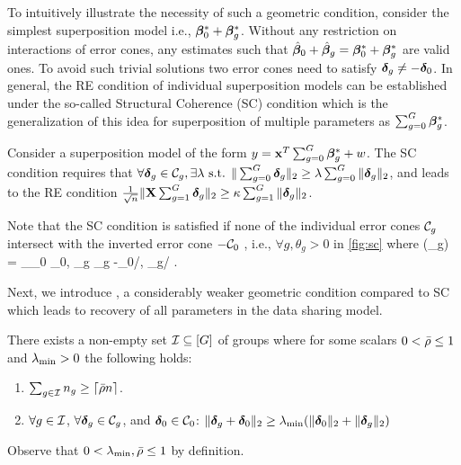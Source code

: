 To intuitively illustrate the necessity of such a geometric condition, consider the simplest superposition model i.e., $\boldsymbol{\beta}^*_0 + \boldsymbol{\beta}^*_g$. Without any restriction on interactions of error cones, any estimates such that $\hat{\boldsymbol{\beta}}_0 + \hat{\boldsymbol{\beta}}_g = \boldsymbol{\beta}^*_0 + \boldsymbol{\beta}^*_g$ are valid ones. To avoid such trivial solutions two error cones need to satisfy $\boldsymbol{\delta}_g \neq -\boldsymbol{\delta}_0$. In general, the RE condition of individual superposition models can be established under the so-called Structural Coherence (SC) condition \cite{guba16, mctr13} which is the generalization of this idea for superposition of multiple parameters as $\sum_{g = 0}^{G} \boldsymbol{\beta}^*_g$.
 
\begin{definition} \label{scc}
	Consider a superposition model of the form $y = \mathbf{x}^T \sum_{g = 0}^{G} \boldsymbol{\beta}^*_g + w$. The SC condition requires that
$	\forall \ddelta_g \in \cC_g, \exists \lambda \text{ s.t. }  \norm{\sum_{g = 0}^{G} \ddelta_g}{2} \geq  \lambda \sum_{g = 0}^{G}  \norm{\ddelta_g}{2}$,
	and leads to the RE condition $\frac{1}{\sqrt{n}}\|\mathbf{X} \sum_{g = 1}^{G} \boldsymbol{\delta}_g\|_{2} \geq \kappa \sum_{g=1}^{G} \|\boldsymbol{\delta}_g\|_{2}$.
\end{definition}

\begin{remark}
	Note that the SC condition is satisfied if none of the individual error cones $\cC_g$ intersect with the inverted error cone $-\cC_0$ \cite{guba16, trop15}, i.e., $\forall g, \theta_g > 0$ in \cref{fig:sc} where 
	\be 
	\nr 
	\cos(\theta_g) = \sup_{\ddelta_0 \in \cC_0, \ddelta_g \in \cC_g} -\langle \ddelta_0/, \ddelta_g/ \rangle.
	\ee
\end{remark}
Next, we introduce \ds, a considerably weaker geometric condition compared to SC which leads to recovery of all parameters in the data sharing model. 
\begin{definition}  \label{incodef}
	There exists a non-empty set $\cI\subseteq [G]$ of groups where for some scalars $0 < \bar{\rho}\leq 1$ and $\lambda_{\min}>0$ the following holds:
	\begin{enumerate}
		\item $\sum_{g\in \cI} n_g\geq \lceil \ratio n\rceil$.
		\item $\forall g \in \cI$, $\forall \ddelta_g \in \cC_g$, and $\ddelta_0\in\cC_0$: $\|\boldsymbol{\delta}_g+\boldsymbol{\delta}_0\|_{2}\geq \lambda_{\min} (\|\boldsymbol{\delta}_0\|_{2}+\|\boldsymbol{\delta}_g\|_{2})$
	\end{enumerate}
	Observe that $0 < \lambda_{\min},\bar{\rho}\leq 1$ by definition.
\end{definition}

